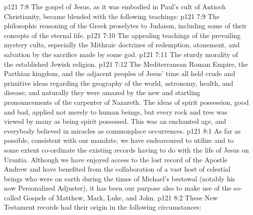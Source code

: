 \vs p121 7:8 The gospel of Jesus, as it was embodied in Paul’s cult of Antioch Christianity, became blended with the following teachings:
\vs p121 7:9 \bibnobreakspace The philosophic reasoning of the Greek proselytes to Judaism, including some of their concepts of the eternal life.
\vs p121 7:10 \bibnobreakspace The appealing teachings of the prevailing mystery cults, especially the Mithraic doctrines of redemption, atonement, and salvation by the sacrifice made by some god.
\vs p121 7:11 \bibnobreakspace The sturdy morality of the established Jewish religion.
\vs p121 7:12 \pc The Mediterranean Roman Empire, the Parthian kingdom, and the adjacent peoples of Jesus’ time all held crude and primitive ideas regarding the geography of the world, astronomy, health, and disease; and naturally they were amazed by the new and startling pronouncements of the carpenter of Nazareth. The ideas of spirit possession, good and bad, applied not merely to human beings, but every rock and tree was viewed by many as being spirit possessed. This was an enchanted age, and everybody believed in miracles as commonplace occurrences.
\vs p121 8:1 As far as possible, consistent with our mandate, we have endeavoured to utilize and to some extent co\hyp{}ordinate the existing records having to do with the life of Jesus on Urantia. Although we have enjoyed access to the lost record of the Apostle Andrew and have benefited from the collaboration of a vast host of celestial beings who were on earth during the times of Michael’s bestowal (notably his now Personalized Adjuster), it has been our purpose also to make use of the so\hyp{}called Gospels of Matthew, Mark, Luke, and John.
\vs p121 8:2 These New Testament records had their origin in the following circumstances:
